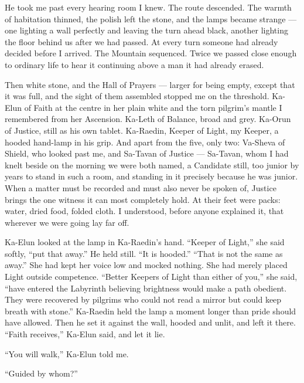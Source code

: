 He took me past every hearing room I knew. The route descended. The warmth of habitation thinned, the polish left the stone, and the lamps became strange --- one lighting a wall perfectly and leaving the turn ahead black, another lighting the floor behind us after we had passed. At every turn someone had already decided before I arrived. The Mountain sequenced. Twice we passed close enough to ordinary life to hear it continuing above a man it had already erased.\par
 
Then white stone, and the Hall of Prayers --- larger for being empty, except that it was full, and the sight of them assembled stopped me on the threshold. Ka-Elun of Faith at the centre in her plain white and the torn pilgrim's mantle I remembered from her Ascension. Ka-Leth of Balance, broad and grey. Ka-Orun of Justice, still as his own tablet. Ka-Raedin, Keeper of Light, my Keeper, a hooded hand-lamp in his grip. And apart from the five, only two: Va-Sheva of Shield, who looked past me, and Sa-Tavan of Justice --- Sa-Tavan, whom I had knelt beside on the morning we were both named, a Candidate still, too junior by years to stand in such a room, and standing in it precisely because he was junior. When a matter must be recorded and must also never be spoken of, Justice brings the one witness it can most completely hold. At their feet were packs: water, dried food, folded cloth. I understood, before anyone explained it, that wherever we were going lay far off.\par
 
Ka-Elun looked at the lamp in Ka-Raedin's hand. ``Keeper of Light,'' she said softly, ``put that away.'' He held still. ``It is hooded.'' ``That is not the same as away.'' She had kept her voice low and mocked nothing. She had merely placed Light outside competence. ``Better Keepers of Light than either of you,'' she said, ``have entered the Labyrinth believing brightness would make a path obedient. They were recovered by pilgrims who could not read a mirror but could keep breath with stone.'' Ka-Raedin held the lamp a moment longer than pride should have allowed. Then he set it against the wall, hooded and unlit, and left it there. ``Faith receives,'' Ka-Elun said, and let it lie.\par
 
``You will walk,'' Ka-Elun told me.\par
 
``Guided by whom?''\par
 

